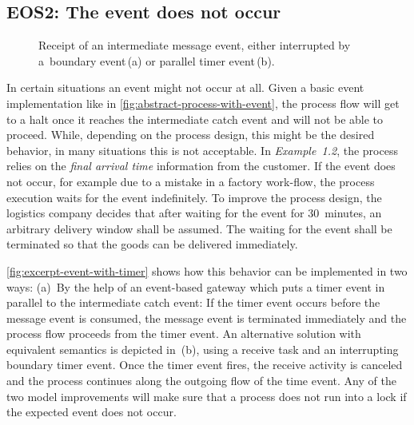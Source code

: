 \subsection*{EOS2: The event does not occur}

\begin{figure}[bth]
	\myfloatalign
	 \quad
	\caption[Tu duo titulo debitas latente]{Receipt of an intermediate message event, either interrupted by a~boundary event\,(a) or parallel timer event\,(b).}
	\label{fig:excerpt-event-with-timer}
\end{figure}

In certain situations an event might not occur at all. Given a basic event implementation like in \autoref{fig:abstract-process-with-event}, the process flow will get to a halt once it reaches the intermediate catch event and will not be able to proceed. While, depending on the process design, this might be the desired behavior, in many situations this is not acceptable.
In \textit{Example~1.2}, the process relies on the \textit{final arrival time} information from the customer. If the event does not occur, for example due to a mistake in a factory work-flow, the process execution waits for the event indefinitely.
To improve the process design, the logistics company decides that after waiting for the event for 30~minutes, an arbitrary delivery window shall be assumed. The waiting for the event shall be terminated so that the goods can be delivered immediately.

\autoref{fig:excerpt-event-with-timer} shows how this behavior can be implemented in two ways: (a)~By the help of an event-based gateway which puts a timer event in parallel to the intermediate catch event: If the timer event occurs before the message event is consumed, the message event is terminated immediately and the process flow proceeds from the timer event.
An alternative solution with equivalent semantics is depicted in~(b), using a receive task and an interrupting boundary timer event. Once the timer event fires, the receive activity is canceled and the process continues along the outgoing flow of the time event.
Any of the two model improvements will make sure that a process does not run into a lock if the expected event does not occur.


